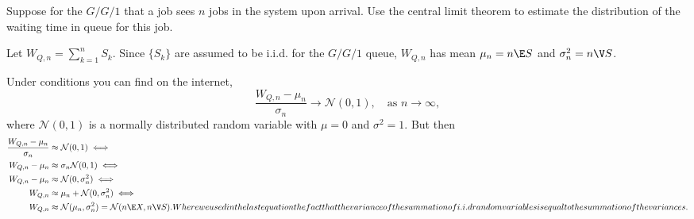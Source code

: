\begin{exercise}
 Suppose for the $G/G/1$ that a job sees $n$ jobs in the system upon arrival.
 Use the central limit theorem to estimate the distribution of the waiting time in queue for this job.
\begin{hint}
 Let $W_{Q,n} = \sum_{k=1}^n S_k$.
 Since $\{S_k\}$ are assumed to be i.i.d.
 for the $G/G/1$ queue, $W_{Q,n}$ has mean $\mu_n = n \E S$ and $\sigma_n^2 = n\V S$.
\end{hint}
\begin{solution} Under conditions you can find on the internet,
 \begin{equation*}
 \frac{W_{Q,n} - \mu_n}{\sigma_n} \to \mathcal{N}(0,1), \quad\text{as } n\to \infty,
 \end{equation*}
 where $\mathcal{N}(0,1)$ is a normally distributed random variable
 with $\mu=0$ and $\sigma^2=1$. But then 
 \begin{align*}
 \frac{W_{Q,n} - \mu_n}{\sigma_n} &\approx \mathcal{N}(0,1) \iff\\
 W_{Q,n} - \mu_n &\approx \sigma_n \mathcal{N}(0,1) \iff\\
 W_{Q,n} - \mu_n &\approx \mathcal{N}(0,\sigma_n^2) \iff\\
 W_{Q,n} &\approx \mu_n + \mathcal{N}(0,\sigma_n^2) \iff\\
 W_{Q,n} &\approx \mathcal{N}(\mu_n,\sigma_n^2) = \mathcal{N}(n\E X, n \V S).
 Where we used in the last equation the fact that the variance of the summation of i.i.d random variables is equal to the summation of the variances.
 \end{align*}
\end{solution}
\end{exercise}




